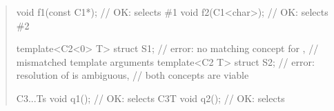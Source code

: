 \begin{quote}
\begin{addedblock}
\begin{codeblock}
void f1(const C1*); // OK:  selects \#1
void f2(C1<char>);  // OK:  selects \#2

template<C2<0> T> struct S1; // error: no matching concept for ,
                             // mismatched template arguments
template<C2 T> struct S2;    // error: resolution of  is ambiguous,
                             // both concepts are viable

C3{...Ts} void q1(); // OK: selects 
C3{T} void q2();     // OK: selects 
\end{codeblock}
\exitexample

\end{addedblock}
\end{quote}

